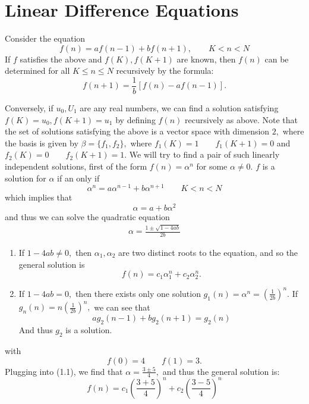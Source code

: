 \documentclass[oneside]{book}
\begin{document}
\section{Linear Difference Equations}
Consider the equation
\[f(n) = af(n-1) + bf(n+1), \qquad K< n< N\]
If $f$ satisfies the above and $f(K), f(K+1)$ are known, then $f(n)$ can be determined for all $K \leq n \leq N$ recursively by the formula:
\[f(n+1) = \frac{1}{b}[f(n) - af(n-1)].\]


Conversely, if $u_0,U_1$ are any real numbers, we can find a solution satisfying $f(K) = u_0, f(K+1) = u_1$ by defining $f(n)$ recursively as above. Note that the set of solutions satisfying the above is a vector space with dimension $2,$ where the basis is given by $\beta = \{f_1, f_2\},$ where $f_1(K) = 1\qquad f_1(K+1) = 0$ and $f_2(K) = 0 \qquad f_2(K+1) = 1.$ We will try to find a pair of such linearly independent solutions, first of the form $f(n) = \alpha^n$ for some $\alpha \neq 0.$ $f$ is a solution for $\alpha$ if an only if \[\alpha^n = a\alpha^{n-1} + b\alpha^{n+1}\qquad K < n< N\] which implies that \[\alpha = a + b\alpha^2\] and thus we can solve the quadratic equation \begin{align}
    \alpha = \frac{1 \pm \sqrt{1 - 4ab}}{2b}
\end{align}
\begin{enumerate}
    \item If $1-4ab\neq 0,$ then $\alpha_1,\alpha_2$ are two distinct roots to the equation, and so the general solution is \[f(n) = c_1 \alpha_1^n + c_2 \alpha_2^n.\]
    \item If $1-4ab = 0,$ then there exists only one solution $g_1(n) = \alpha^n = (\frac{1}{2b})^n.$ If $g_n(n) = n(\frac{1}{2b})^n,$ we can see that \[ag_2(n-1) + bg_2(n+1) = g_2(n)\] And thus $g_2$ is a solution.
\end{enumerate}

 with \[f(0) = 4\qquad f(1) = 3.\] Plugging into (1.1), we find that $\alpha = \frac{3 \pm 5}{4},$ and thus the general solution is:
\[f(n) = c_1 \left(\frac{3 + 5}{4}\right)^n + c_2\left(\frac{3 - 5}{4}\right)^n\]
\end{document}
